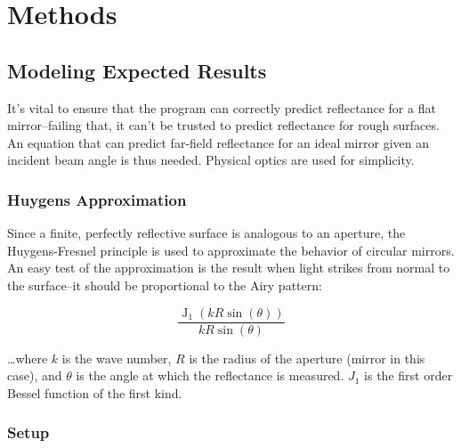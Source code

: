 \documentclass[etd,twoside,senior,noacknowledgments]{BYUPhys}
\DeclareMathOperator{\J}{J}
\begin{document}






\chapter{Methods} \label{chap:methods}

\section{Modeling Expected Results} \label{sec:expected_results}

It's vital to ensure that the program can correctly predict reflectance for a flat mirror--failing that, it can't be trusted to predict reflectance for rough surfaces. An equation that can predict far-field reflectance for an ideal mirror given an incident beam angle is thus needed. Physical optics are used for simplicity.

\subsection{Huygens Approximation} \label{subsec:huygens_approx}

Since a finite, perfectly reflective surface is analogous to an aperture, the Huygens-Fresnel principle is used to approximate the behavior of circular mirrors. An easy test of the approximation is the result when light strikes from normal to the surface--it should be proportional to the Airy pattern:

\begin{equation}\label{eq:airy}
  \frac{\J_1(kR\sin(\theta))}{kR\sin(\theta)}
\end{equation}

\ldots where $k$ is the wave number, $R$ is the radius of the aperture (mirror in this case), and $\theta$ is the angle at which the reflectance is measured. $J_1$ is the first order Bessel function of the first kind.

\subsection{Setup} \label{sec:setup}
\end{document}
